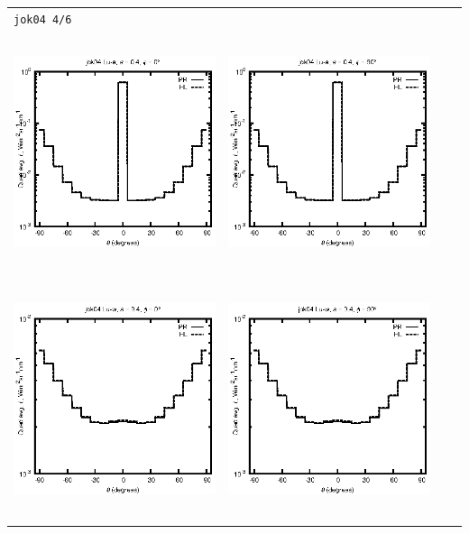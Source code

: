 \begin{tabular}{c c c c}
\multicolumn{4}{l}{\texttt{jok04 4/6}} \\
\includegraphics[height=7cm]{../eps/jok04_Lu_a_fwd.eps} &
\includegraphics[height=7cm]{../eps/jok04_Lu_a_cross.eps}\\
\includegraphics[height=7cm]{../eps/jok04_Lu_w_fwd.eps} &
\includegraphics[height=7cm]{../eps/jok04_Lu_w_cross.eps} \\

\end{tabular}
